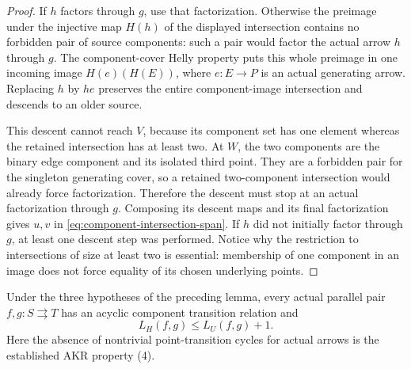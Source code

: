 \begin{proof}
If $h$ factors through $g$, use that factorization. Otherwise
the preimage under the injective map $H(h)$ of the displayed
intersection contains no forbidden pair of source components:
such a pair would factor the actual arrow $h$ through $g$.
The component-cover Helly property puts this whole preimage in
one incoming image $H(e)(H(E))$, where $e:E\to P$ is an actual
generating arrow. Replacing $h$ by $he$ preserves the entire
component-image intersection and descends to an older source.

This descent cannot reach $V$, because its component set has one
element whereas the retained intersection has at least two.
At $W$, the two components are the binary edge component and its
isolated third point. They are a forbidden pair for the singleton
generating cover, so a retained two-component intersection would
already force factorization. Therefore the descent must stop
at an actual factorization through $g$. Composing its descent
maps and its final factorization gives $u,v$ in
\eqref{eq:component-intersection-span}. If $h$ did not
initially factor through $g$, at least one descent step was
performed. Notice why the restriction to intersections of size
at least two is essential: membership of one component in an
image does not force equality of its chosen underlying points.
\end{proof}

\begin{lemma}
\label{C:component-path-inflation}
Under the three hypotheses of the preceding lemma, every actual
parallel pair $f,g:S\rightrightarrows T$ has an acyclic component
transition relation and
\[
                           L_H(f,g)\leq L_U(f,g)+1.
 \tag{PB}\label{eq:component-path-bound}
\]
Here the absence of nontrivial point-transition cycles for actual
arrows is the established AKR property (4).
\end{lemma}

